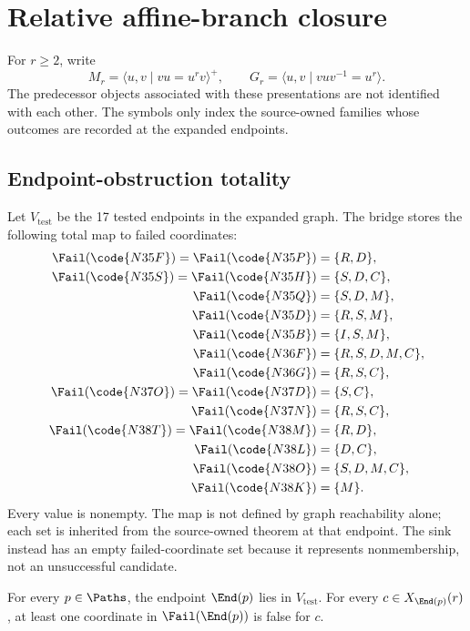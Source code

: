 \section{Relative affine-branch closure}
\label{sec:theorem}

For $r\ge2$, write
\[
M_r=\langle u,v\mid vu=u^rv\rangle^+,
\qquad
G_r=\langle u,v\mid vuv^{-1}=u^r\rangle.
\]
The predecessor objects associated with these presentations are not identified
with each other.  The symbols only index the source-owned families whose
outcomes are recorded at the expanded endpoints.

\subsection{Endpoint-obstruction totality}

Let $V_{\mathrm{test}}$ be the 17 tested endpoints in the expanded graph.  The
bridge stores the following total map to failed coordinates:
\begin{align*}
\Fail(\code{N35F})=\Fail(\code{N35P})&=\{R,D\},\\
\Fail(\code{N35S})=\Fail(\code{N35H})&=\{S,D,C\},\\
\Fail(\code{N35Q})&=\{S,D,M\},\\
\Fail(\code{N35D})&=\{R,S,M\},\\
\Fail(\code{N35B})&=\{I,S,M\},\\
\Fail(\code{N36F})&=\{R,S,D,M,C\},\\
\Fail(\code{N36G})&=\{R,S,C\},\\
\Fail(\code{N37O})=\Fail(\code{N37D})&=\{S,C\},\\
\Fail(\code{N37N})&=\{R,S,C\},\\
\Fail(\code{N38T})=\Fail(\code{N38M})&=\{R,D\},\\
\Fail(\code{N38L})&=\{D,C\},\\
\Fail(\code{N38O})&=\{S,D,M,C\},\\
\Fail(\code{N38K})&=\{M\}.
\end{align*}
Every value is nonempty.  The map is not defined by graph reachability alone;
each set is inherited from the source-owned theorem at that endpoint.  The
sink  instead has an empty failed-coordinate set because it represents
nonmembership, not an unsuccessful candidate.

\begin{lemma}
\label{lem:endpoint-totality}
For every $p\in\Paths$, the endpoint $\End(p)$ lies in
$V_{\mathrm{test}}$.  For every $c\in X_{\End(p)}(r)$, at least one coordinate
in $\Fail(\End(p))$ is false for $c$.
\end{lemma}

